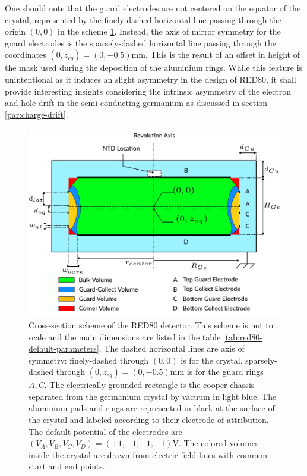 One should note that the guard electrodes are not centered on the equator of the crystal, represented by the finely-dashed horizontal line passing through the origin $(0,0)$ in the scheme \ref{fig:red80-scheme}. Instead, the axis of mirror symmetry for the guard electrodes is the sparsely-dashed  horizontal line passing through the coordinates $(0, z_{eq})=(0, -0.5)\si{\mm}$. This is the result of an offset in height of the mask used during the deposition of the aluminium rings. While this feature is unintentional as it induces an slight asymmetry in the design of RED80, it shall provide interesting insights considering the intrinsic asymmetry of the electron and hole drift in the semi-conducting germanium as discussed in section \ref{par:charge-drift}.

\begin{figure}
\centering
\includegraphics[scale=1]{Figures/ElectrodesExperimental/scheme_red80.pdf}
\caption{Cross-section scheme of the RED80 detector. This scheme is not to scale and the main dimensions are listed in the table \ref{tab:red80-default-parameters}. The dashed horizontal lines are axis of symmetry: finely-dashed through $(0,0)$ is for the crystal, sparsely-dashed through $(0, z_{eq})=(0, -0.5)\si{\mm}$  is for the guard rings $A,C$. The electrically grounded rectangle is the cooper chassis separated from the germanium crystal by vacuum in light blue. The aluminium pads and rings are represented in black at the surface of the crystal and labeled according to their electrode of attribution. The default potential of the electrodes are $(V_A, V_B, V_C, V_D) = (+1, +1, -1, -1) \si{\volt}$. The colored volumes inside the crystal are drawn from electric field lines with common start and end points.}
\label{fig:red80-scheme}
\end{figure}

